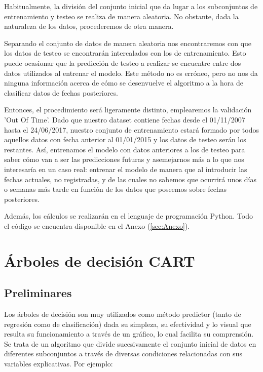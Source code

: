 \documentclass[12pt,twoside]{article}
\begin{document}
Habitualmente, la división del conjunto inicial que da lugar a los subconjuntos de entrenamiento y testeo se realiza de manera aleatoria. No obstante, dada la naturaleza de los datos, procederemos de otra manera.

Separando el conjunto de datos de manera aleatoria nos encontraremos con que los datos de testeo se encontrarán intercalados con los de entrenamiento. Esto puede ocasionar que la predicción de testeo a realizar se encuentre entre dos datos utilizados al entrenar el modelo. Este método no es erróneo, pero no nos da ninguna información acerca de cómo se desenvuelve el algoritmo a la hora de clasificar datos de fechas posteriores.

Entonces, el procedimiento será ligeramente distinto, emplearemos la validación 'Out Of Time'. Dado que nuestro dataset contiene fechas desde el 01/11/2007 hasta el 24/06/2017, nuestro conjunto de entrenamiento estará formado por todos aquellos datos con fecha anterior al 01/01/2015 y los datos de testeo serán los restantes. Así, entrenamos el modelo con datos anteriores a los de testeo para saber cómo van a ser las predicciones futuras y asemejarnos más a lo que nos interesaría en un caso real: entrenar el modelo de manera que al introducir las fechas actuales, no registradas, y de las cuales no sabemos que ocurrirá unos días o semanas más tarde en función de los datos que poseemos sobre fechas posteriores.

Además, los cálculos se realizarán en el lenguaje de programación Python. Todo el código se encuentra disponible en el Anexo (\ref{sec:Anexo}).



\newpage



\section{Árboles de decisión CART}
\subsection{Preliminares}

Los árboles de decisión son muy utilizados como método predictor (tanto de regresión como de clasificación) dada su simpleza, su efectividad y lo visual que resulta su funcionamiento a través de un gráfico, lo cual facilita su comprensión. Se trata de un algoritmo que divide sucesivamente el conjunto inicial de datos en diferentes subconjuntos a través de diversas condiciones relacionadas con sus variables explicativas. Por ejemplo:
\end{document}
